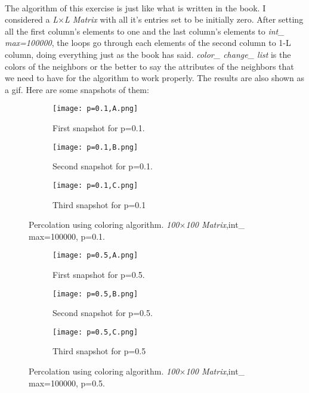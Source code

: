 \documentclass[12pt]{article}
\begin{document}
\paragraph*{} The algorithm of this exercise is just like what is written in the book. I considered a \textit{L$\times$L Matrix} with all it's entries set to be initially zero. After setting all the first column's elements to one and the last column's elements to \textit{int\_ max=100000}, the loops go through each elements of the second column to 1-L column, doing everything just as the book has said. \textit{color\_ change\_ list} is the colors of the neighbors or the better to say the attributes of the neighbors that we need to have for the algorithm to work properly. The results are also shown as a gif. Here are some snapshots of them:
\begin{figure}[H]
	\begin{subfigure}[t]{0.3\textwidth}
		\centering
		\texttt{[image: p=0.1,A.png]}
		\label{fig:mesh5.1}
		\caption{First snapshot for p=0.1.}
	\end{subfigure}\hfill
	\begin{subfigure}[t]{0.3\textwidth}
		\centering
		\texttt{[image: p=0.1,B.png]}
		\label{fig:mesh5.2}
		\caption{Second snapshot for p=0.1.}
	\end{subfigure}\hfill
	\begin{subfigure}[t]{0.3\textwidth}
		\centering
		\texttt{[image: p=0.1,C.png]}
		\label{fig:mesh5.3}
		\caption{Third snapshot for p=0.1}
	\end{subfigure}
	\centering
	\label{fig:mesh5}
	\caption{Percolation using coloring algorithm. \textit{100$\times$100 Matrix},int\_ max=100000, p=0.1.}
\end{figure}
\begin{figure}[H]
	\begin{subfigure}[t]{0.3\textwidth}
		\centering
		\texttt{[image: p=0.5,A.png]}
		\label{fig:mesh6.1}
		\caption{First snapshot for p=0.5.}
	\end{subfigure}\hfill
	\begin{subfigure}[t]{0.3\textwidth}
		\centering
		\texttt{[image: p=0.5,B.png]}
		\label{fig:mesh6.2}
		\caption{Second snapshot for p=0.5.}
	\end{subfigure}\hfill
	\begin{subfigure}[t]{0.3\textwidth}
		\centering
		\texttt{[image: p=0.5,C.png]}
		\label{fig:mesh6.3}
		\caption{Third snapshot for p=0.5}
	\end{subfigure}
	\centering
	\label{fig:mesh6}
	\caption{Percolation using coloring algorithm. \textit{100$\times$100 Matrix},int\_ max=100000, p=0.5.}
\end{figure}
\end{document}

